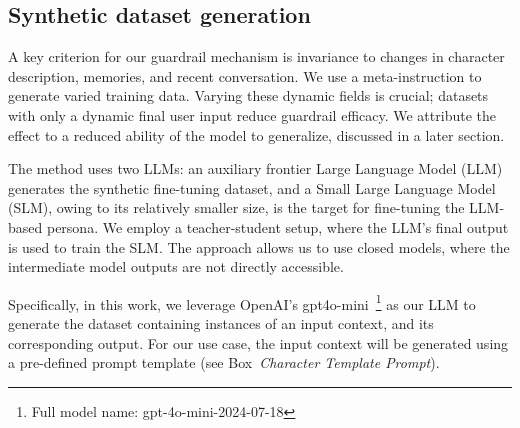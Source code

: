 \documentclass[letterpaper]{article}
\newcommand{\allm}{OpenAI's gpt4o-mini}  %
\newcommand{\fullallm}{gpt-4o-mini-2024-07-18}
\begin{document}
\subsection{Synthetic dataset generation}
A key criterion for our guardrail mechanism is invariance to changes in character description, memories, and recent conversation. We use a meta-instruction to generate varied training data. Varying these dynamic fields is crucial; datasets with only a dynamic final user input reduce guardrail efficacy. We attribute the effect to a reduced ability of the model to generalize, discussed in a later section.

The method uses two LLMs: an auxiliary frontier Large Language Model (LLM) generates the synthetic fine-tuning dataset, and a Small Large Language Model (SLM), owing to its relatively smaller size, is the target for fine-tuning the LLM-based persona. We employ a teacher-student setup, where the LLM's final output is used to train the SLM.\@ 
The approach allows us to use closed models, where the intermediate model outputs are not directly accessible.

Specifically, in this work, we leverage \allm~\footnote{Full model name: \fullallm} as our LLM to generate the dataset containing instances of an input context, and its corresponding output. For our use case, the input context will be generated using a pre-defined prompt template (see Box~\textit{Character Template Prompt}).
\end{document}
